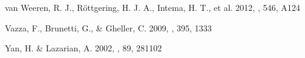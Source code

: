 \documentclass[twocolumn]{aastex61}
\begin{document}
\begin{thebibliography}{}
van Weeren, R. J., R\"ottgering, H. J. A., Intema, H. T., et al. 2012, 
\aap, 546, A124 

Vazza, F., Brunetti, G., \& Gheller, C. 2009, 
\mnras, 395, 1333

Yan, H. \& Lazarian, A. 2002,
\prl, 89, 281102

\end{thebibliography}
\end{document}
